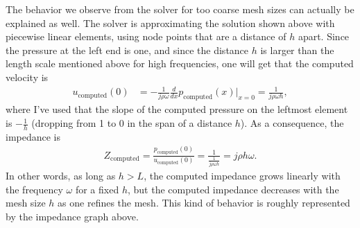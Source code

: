 \documentclass{article}
\begin{document}
The behavior we observe from the solver for too coarse mesh sizes can
actually be explained as well. The solver is approximating the
solution shown above with piecewise linear elements, using node points
that are a distance of $h$ apart. Since the pressure at the left end
is one, and since the distance $h$ is larger than the length scale
mentioned above for high frequencies, one will get that the computed
velocity is
\begin{align*}
  u_\text{computed}(0)
  &=
  -\frac{1}{j\rho\omega} \frac{d}{dx} p_\text{computed}(x)|_{x=0}
  = \frac{1}{j\rho\omega h},
\end{align*}
where I've used that the slope of the computed pressure on the
leftmost element is $-\frac{1}{h}$ (dropping from 1 to 0 in the span
of a distance $h$). As a consequence, the impedance is
\begin{align*}
  Z_\text{computed} = \frac{p_\text{computed}(0)}{u_\text{computed}(0)}
  = \frac{1}{\frac{1}{j\rho\omega h}}
  = j\rho h \omega.
\end{align*}
In other words, as long as $h>L$, the computed impedance grows
linearly with the frequency $\omega$ for a fixed $h$, but the computed
impedance decreases with the mesh size $h$ as one refines the
mesh. This kind of behavior is roughly represented by the impedance
graph above.
\end{document}
